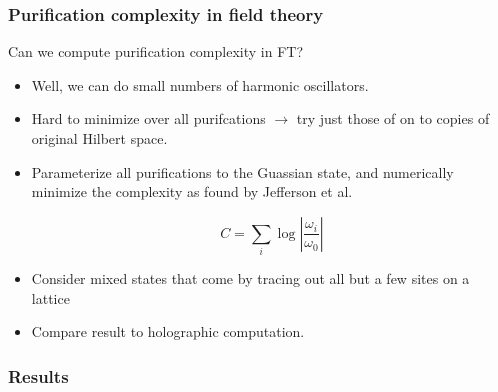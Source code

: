 \documentclass[10pt,aspectratio=169]{beamer}
\begin{document}
\begin{frame}
\frametitle{Purification complexity in field theory}

Can we compute purification complexity in FT?

\begin{itemize}

\item Well, we can do small numbers of harmonic oscillators.

\item Hard to minimize over all purifcations $\rightarrow$ try just those of on to copies of original Hilbert space.

\item Parameterize all purifications to the Guassian state, and numerically minimize the complexity as found by Jefferson et al.

$$C = \sum_i \log \left| \frac{\omega_i}{\omega_0} \right|$$

\item Consider mixed states that come by tracing out all but a few sites on a lattice

\item Compare result to holographic computation.

\end{itemize}

\end{frame}

\begin{frame}
\frametitle{Results}

\end{frame}
\end{document}
